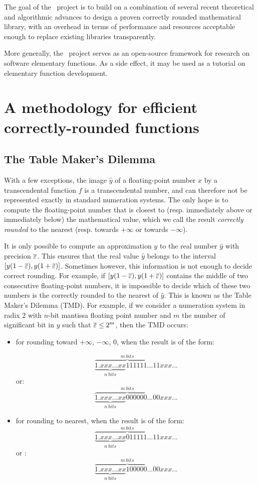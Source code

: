 The goal of the \crlibm\ project is to build on a combination of
several recent theoretical and algorithmic advances to design a proven
correctly rounded mathematical library, with an overhead  in terms of
performance and resources acceptable enough to replace existing
libraries transparently. 

More generally, the \crlibm\ project serves as an open-source
framework for research on software elementary functions. As a side
effect, it may be used as a tutorial on elementary function
development.




\section{A methodology for efficient correctly-rounded functions}
\label{section:methodology}


\subsection{The Table Maker's Dilemma}

With a few exceptions, the image $\hat{y}$ of a floating-point number $x$ by
a transcendental function $f$ is a transcendental number, and can
therefore not be represented exactly in standard numeration systems.
The only hope is to compute the floating-point number that is closest
to (resp.  immediately above or immediately below) the mathematical
value, which we call the result \emph{correctly rounded} to the
nearest (resp.  towards $+\infty$ or towards $-\infty$).

It is only possible to compute an approximation ${y}$ to the real
number $\hat{y}$ with precision ${\overline{\varepsilon}}{}$. This ensures that the real value
$\hat{y}$ belongs to the interval $[{y}(1-{\overline{\varepsilon}}{}) , {y}(1+{\overline{\varepsilon}}{})]$.
Sometimes however, this information is not enough to decide correct
rounding. For example, if $[{y}(1-{\overline{\varepsilon}}{}) , {y}(1+{\overline{\varepsilon}}{})]$
contains the middle of two consecutive floating-point numbers, it is
impossible to decide which of these two numbers is the correctly
rounded to the nearest of $\hat{y}$. This is known as the Table Maker's
Dilemma (TMD). For example, if we consider a numeration system in radix $2$ with $n$-bit mantissa floating point number and $m$ the number of significant bit in $y$ such that ${\overline{\varepsilon}}{} \leq 2^m$, then the TMD occurs:

\begin{itemize}
\item for rounding toward $+\infty$, $-\infty$, $0$, when the result is of the form:

$$\overbrace{\underbrace{1.xxx...xx}_{n~bits}111111...11}^{m~bits}xxx...$$
or:
$$\overbrace{\underbrace{1.xxx...xx}_{n~bits}000000...00}^{m~bits}xxx...$$
\item for rounding to nearest, when the result is of the form:
$$\overbrace{\underbrace{1.xxx...xx}_{n~bits}011111...11}^{m~bits}xxx...$$
or :
$$\overbrace{\underbrace{1.xxx...xx}_{n~bits}100000...00}^{m~bits}xxx...$$
\end{itemize}


